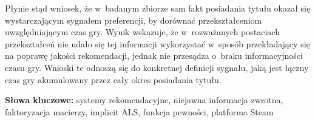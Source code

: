 Płynie stąd wniosek, że w~badanym zbiorze sam fakt posiadania tytułu okazał się wystarczającym sygnałem preferencji, by dorównać przekształceniom uwzględniającym czas gry. Wynik wskazuje, że w~rozważanych postaciach przekształceń nie udało się tej informacji wykorzystać w~sposób przekładający się na poprawę jakości rekomendacji, jednak nie przesądza o~braku informacyjności czasu gry. Wnioski te odnoszą się do konkretnej definicji sygnału, jaką jest łączny czas gry akumulowany przez cały okres posiadania tytułu.

\vspace{1em}
\noindent\textbf{Słowa kluczowe:} systemy rekomendacyjne, niejawna informacja zwrotna, faktoryzacja macierzy, implicit ALS, funkcja pewności, platforma Steam